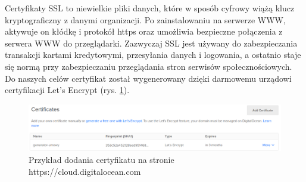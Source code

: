 Certyfikaty SSL to niewielkie pliki danych, które w sposób cyfrowy wiążą klucz kryptograficzny z danymi organizacji. Po zainstalowaniu na serwerze WWW, aktywuje on kłódkę i protokół https oraz umożliwia bezpieczne połączenia z serwera WWW do przeglądarki. Zazwyczaj SSL jest używany do zabezpieczania transakcji kartami kredytowymi, przesyłania danych i logowania, a ostatnio staje się normą przy zabezpieczaniu przeglądania stron serwisów społecznościowych.
Do naszych celów certyfikat został wygenerowany dzięki darmowemu urządowi certyfikacji Let's Encrypt (rys. \ref{fig:ssl}).

\begin{figure}[H]
    \centering
    \includegraphics[width=6in]{images/ssl.png}
    \caption{Przykład dodania certyfikatu na stronie https://cloud.digitalocean.com \label{fig:ssl}}
\end{figure}